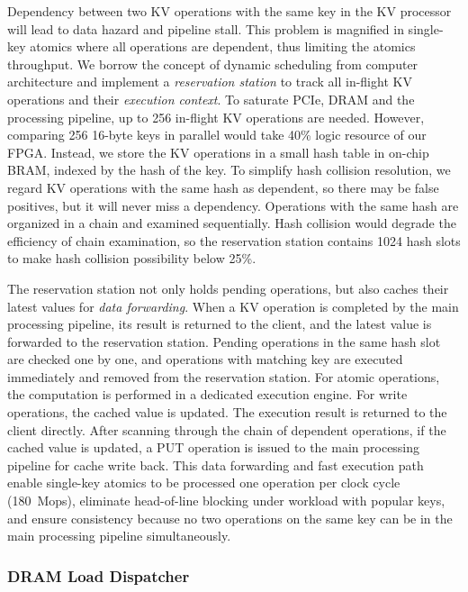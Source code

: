 Dependency between two KV operations with the same key in the KV processor will lead to data hazard and pipeline stall.
This problem is magnified in single-key atomics where all operations are dependent, thus limiting the atomics throughput.
We borrow the concept of dynamic scheduling from computer architecture and implement a \textit{reservation station} to track all in-flight KV operations and their \textit{execution context}.
To saturate PCIe, DRAM and the processing pipeline, up to 256 in-flight KV operations are needed.
However, comparing 256 16-byte keys in parallel would take 40\% logic resource of our FPGA.
Instead, we store the KV operations in a small hash table in on-chip BRAM, indexed by the hash of the key.
To simplify hash collision resolution, we regard KV operations with the same hash as dependent, so there may be false positives, but it will never miss a dependency.
Operations with the same hash are organized in a chain and examined sequentially.
Hash collision would degrade the efficiency of chain examination, so the reservation station contains 1024 hash slots to make hash collision possibility below 25\%.

The reservation station not only holds pending operations, but also caches their latest values for \textit{data forwarding}.
When a KV operation is completed by the main processing pipeline, its result is returned to the client, and the latest value is forwarded to the reservation station.
Pending operations in the same hash slot are checked one by one, and operations with matching key are executed immediately and removed from the reservation station.
For atomic operations, the computation is performed in a dedicated execution engine.
For write operations, the cached value is updated.
The execution result is returned to the client directly.
After scanning through the chain of dependent operations, if the cached value is updated, a PUT operation is issued to the main processing pipeline for cache write back.
This data forwarding and fast execution path enable single-key atomics to be processed one operation per clock cycle (180~Mops), eliminate head-of-line blocking under workload with popular keys, and ensure consistency because no two operations on the same key can be in the main processing pipeline simultaneously.


\subsubsection{DRAM Load Dispatcher}
\label{kvdirect:sec:dram-cache}


